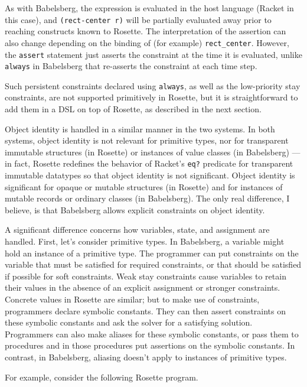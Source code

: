 \documentclass{article}
\begin{document}
As with Babelsberg, the expression is evaluated in the host language
(Racket in this case), and \verb|(rect-center r)| will be partially
evaluated away prior to reaching constructs known to Rosette.  The
interpretation of the assertion can also change depending on the
binding of (for example) \verb|rect_center|.  However, the
\verb|assert| statement just asserts the constraint at the time it is
evaluated, unlike \verb|always| in Babelsberg that re-asserts the
constraint at each time step.

Such persistent constraints declared using \verb|always|, as well as
the low-priority stay constraints, are not supported primitively in
Rosette, but it is straightforward to add them in a DSL on top of
Rosette, as described in the next section.

Object identity is handled in a similar manner in the two systems.  In
both systems, object identity is not relevant for primitive types, nor
for transparent immutable structures (in Rosette) or instances of
value classes (in Babelsberg) --- in fact, Rosette redefines the
behavior of Racket's \verb|eq?| predicate for transparent immutable
datatypes so that object identity is not significant.  Object identity
is significant for opaque or mutable structures (in Rosette) and for
instances of mutable records or ordinary classes (in Babelsberg).  The
only real difference, I believe, is that Babelsberg allows explicit
constraints on object identity.

A significant difference concerns how variables, state, and assignment
are handled.  First, let's consider primitive types.  In Babelsberg, a
variable might hold an instance of a primitive type.  The programmer
can put constraints on the variable that must be satisfied for
required constraints, or that should be satisfied if possible for soft
constraints.  Weak stay constraints cause variables to retain their
values in the absence of an explicit assignment or stronger
constraints.  Concrete values in Rosette are similar; but to make use
of constraints, programmers declare symbolic constants.  They can then
assert constraints on these symbolic constants and ask the solver for
a satisfying solution.  Programmers can also make aliases for these
symbolic constants, or pass them to procedures and in those procedures
put assertions on the symbolic constants.  In contrast, in Babelsberg,
aliasing doesn't apply to instances of primitive types.

For example, consider the following Rosette program.
\end{document}
